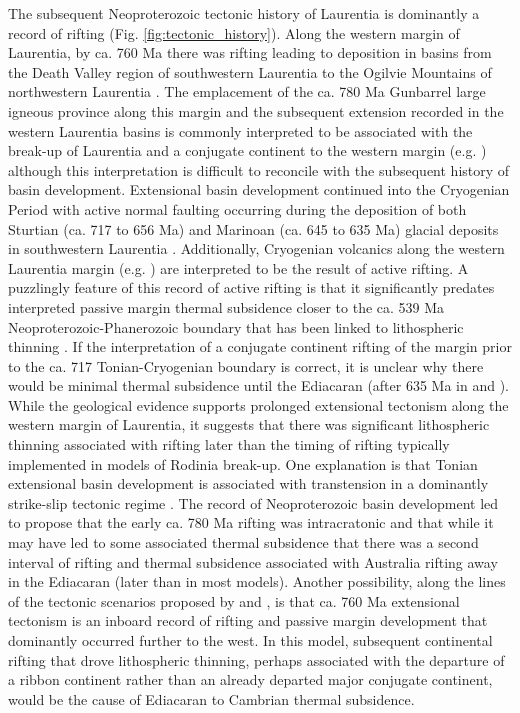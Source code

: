 \documentclass[twocolumn, switch]{article} %
\begin{document}
The subsequent Neoproterozoic tectonic history of Laurentia is dominantly a record of rifting (Fig. \ref{fig:tectonic_history}). Along the western margin of Laurentia, by ca. 760 Ma there was rifting leading to deposition in basins from the Death Valley region of southwestern Laurentia to the Ogilvie Mountains of northwestern Laurentia \citep{Macdonald2013a, Strauss2015a, Dehler2017a, Rooney2017a}. The emplacement of the ca. 780 Ma Gunbarrel large igneous province \citep{Harlan2003a} along this margin and the subsequent extension recorded in the western Laurentia basins is commonly interpreted to be associated with the break-up of Laurentia and a conjugate continent to the western margin (e.g. \citealp{Li2008a}) although this interpretation is difficult to reconcile with the subsequent history of basin development. Extensional basin development continued into the Cryogenian Period with active normal faulting occurring during the deposition of both Sturtian (ca. 717 to 656 Ma) and Marinoan (ca. 645 to 635 Ma) glacial deposits in southwestern Laurentia \citep{Yonkee2014a, Nelson2020a}. Additionally, Cryogenian volcanics along the western Laurentia margin (e.g. \citealp{Eyster2018a}) are interpreted to be the result of active rifting.  A puzzlingly feature of this record of active rifting is that it significantly predates interpreted passive margin thermal subsidence closer to the ca. 539 Ma Neoproterozoic-Phanerozoic boundary that has been linked to lithospheric thinning \citep{Bond1984a, Levy1991a}. If the interpretation of a conjugate continent rifting of the margin prior to the ca. 717 Tonian-Cryogenian boundary is correct, it is unclear why there would be minimal thermal subsidence until the Ediacaran (after 635 Ma in \citealp{Levy1991a} and \citealp{Witkosky2018a}). While the geological evidence supports prolonged extensional tectonism along the western margin of Laurentia, it suggests that there was significant lithospheric thinning associated with rifting later than the timing of rifting typically implemented in models of Rodinia break-up. One explanation is that Tonian extensional basin development is associated with transtension in a dominantly strike-slip tectonic regime \citep{Smith2015b, Strauss2015a}. The record of Neoproterozoic basin development led \cite{Yonkee2014a} to propose that the early ca. 780 Ma rifting was intracratonic and that while it may have led to some associated thermal subsidence that there was a second interval of rifting and thermal subsidence associated with Australia rifting away in the Ediacaran (later than in most models). Another possibility, along the lines of the tectonic scenarios proposed by \citet{Ross1991a} and \citet{Colpron2002a}, is that ca. 760 Ma extensional tectonism is an inboard record of rifting and passive margin development that dominantly occurred further to the west. In this model, subsequent continental rifting that drove lithospheric thinning, perhaps associated with the departure of a ribbon continent rather than an already departed major conjugate continent, would be the cause of Ediacaran to Cambrian thermal subsidence.
\end{document}
